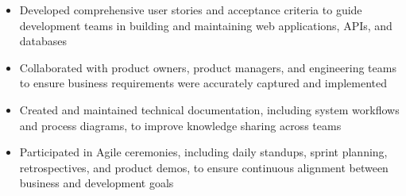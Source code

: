 \par\bigskip
{}
\par\smallskip
\begin{minipage}{13.75cm}
  \begin{minipage}{6.5cm}
    \begin{itemize}
      \item Developed comprehensive user stories and acceptance criteria to guide development teams in building and maintaining web applications, APIs, and databases
      \item Collaborated with product owners, product managers, and engineering teams to ensure business requirements were accurately captured and implemented
    \end{itemize}
  \end{minipage}
  \hfill
  \begin{minipage}{6.5cm}
    \begin{itemize}
      \item Created and maintained technical documentation, including system workflows and process diagrams, to improve knowledge sharing across teams
      \item Participated in Agile ceremonies, including daily standups, sprint planning, retrospectives, and product demos, to ensure continuous alignment between business and development goals
    \end{itemize}
  \end{minipage}
\end{minipage}
\par\smallskip
\divider

